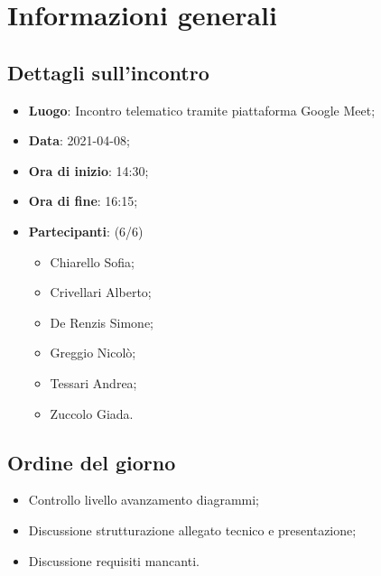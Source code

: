 \section{Informazioni generali}

\subsection{Dettagli sull'incontro}
\begin{itemize}
\item \textbf{Luogo}: Incontro telematico tramite piattaforma Google Meet;
\item \textbf{Data}: 2021-04-08;
\item \textbf{Ora di inizio}: 14:30;
\item \textbf{Ora di fine}: 16:15;
\item \textbf{Partecipanti}: (6/6) 
\begin{itemize}
	\item Chiarello Sofia;
	\item Crivellari Alberto;
	\item De Renzis Simone;
	\item Greggio Nicolò;
	\item Tessari Andrea;
	\item Zuccolo Giada.
\end{itemize}
\end{itemize}

\subsection{Ordine del giorno}
\begin{itemize}
	\item Controllo livello avanzamento diagrammi;
	\item Discussione strutturazione allegato tecnico e presentazione;
	\item Discussione requisiti mancanti.
\end{itemize}


